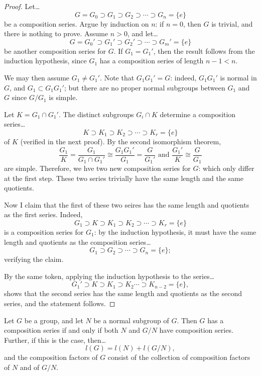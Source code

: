 \begin{proof}
Let\dots
$$G = G_0 \supset G_1 \supset G_2 \supset \cdots \supset G_n = \{ e \}$$
be a composition series. Argue by induction on $n$: if $n = 0$, then $G$ is trivial, and there is nothing to prove. Assume $n > 0$, and let\dots
$$G = G_0' \supset G_1' \supset G_2' \supset \cdots \supset G_m' = \{ e \}$$
be another composition series for $G$. If $G_1 = G_1'$, then the result follows from the induction hypothesis, since $G_1$ has a composition series of length $n-1 < n$.

We may then assume $G_1 \neq G_1'$. Note that $G_1G_1' = G$: indeed, $G_1G_1'$ is normal in $G$, and $G_1 \subset G_1G_1'$; but there are no proper normal subgroups between $G_1$ and $G$
since $G/G_1$ is simple.

Let $K = G_1 \cap G_1'$. The distinct subgroups $G_i \cap K$ determine a composition series\dots
$$K \supset K_1 \supset K_2 \supset \cdots \supset K_r = \{ e \}$$
of $K$ (verified in the next proof). By the second isomorphism theorem,
$$\frac{G_1}{K} = \frac{G_1}{G_1 \cap G_1'} \cong \frac{G_1G_1'}{G_1} = \frac{G}{G_1'} \textrm{  and  } \frac{G_1'}{K} \cong \frac{G}{G_1}$$
are simple. Therefore, we hve two new composition series for $G$:
which only differ at the first step. These two series trivially have the same length and the same quotients.

Now I claim that the first of these two seires has the same length and quotients as the first series. Indeed,
$$G_1 \supset K \supset K_1 \supset K_2 \supset \cdots \supset K_r = \{ e \}$$
is a composition series for $G_1$: by the induction hypothesis, it must have the same length and quotients as the composition series\dots
$$G_1 \supset G_2 \supset \cdots \supset G_n = \{ e \};$$
verifying the claim.

By the same token, applying the induction hypothesis to the series\dots
$$G_1' \supset K \supset K_1 \supset K_2 \cdots \supset K_{n-2} = \{ e \},$$
shows that the second series has the same length and quotients as the second series, and the statement follows.
\end{proof}

\begin{proposition}
\label{subcompositionseries}
Let $G$ be a group, and let $N$ be a normal subgroup of $G$. Then $G$ has a composition series if and only if both $N$ and $G/N$ have composition series. Further, if this is the case, then\dots
$$l(G) = l(N) + l(G/N),$$
and the composition factors of $G$ consist of the collection of composition factors of $N$ and of $G/N$.
\end{proposition}

